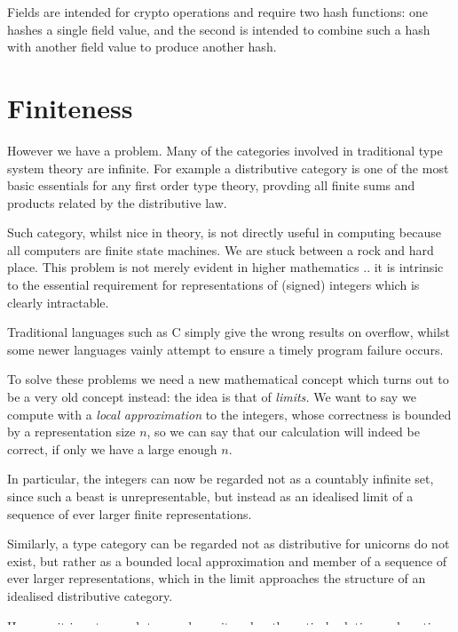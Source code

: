 Fields are intended for crypto operations and require two hash functions:
one hashes a single field value, and the second is intended to combine 
such a hash with another field value to produce another hash.

 
\section{Finiteness}
However we have a problem. Many of the categories involved in traditional
type system theory are infinite. For example a distributive category is
one of the most basic essentials for any first order type theory,
provding all finite sums and products related by the distributive law.

Such category, whilst nice in theory, is not directly useful in 
computing because all computers are finite state machines. We are stuck 
between a rock and hard place. This problem is not merely evident in
higher mathematics .. it is intrinsic to the essential requirement for representations
of (signed) integers which is clearly intractable.

Traditional languages such as C simply give the wrong results on overflow,
whilst some newer languages vainly attempt to ensure a timely program
failure occurs.


To solve these problems we need a new mathematical concept which turns out
to be a very old concept instead: the idea is that of {\em limits.}
We want to say we compute with a {\em local approximation} to the integers,
whose correctness is bounded by a representation size $n$, so we can say
that our calculation will indeed be correct, if only we have a large enough $n$.

In particular, the integers can now be regarded not as a countably infinite set,
since such a beast is unrepresentable, but instead as an idealised limit
of a sequence of ever larger finite representations.

Similarly, a type category can be regarded not as distributive for unicorns
do not exist, but rather as a bounded local approximation and member of
a sequence of ever larger representations, which in the limit approaches
the structure of an idealised distributive category.

However it is not enough to merely posit such a theoretical solution
and continue as before; instead we must in fact be able to compute
the bounds required to ensure the correctness of a program, a new
and nontrivial task.

\section{Type Model}
We define two classes of categories.

